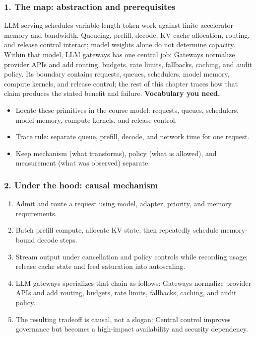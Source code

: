 \subsubsection*{1. The map: abstraction and prerequisites}
LLM serving schedules variable-length token work against finite accelerator memory and bandwidth. Queueing, prefill, decode, KV-cache allocation, routing, and release control interact; model weights alone do not determine capacity.
Within that model, LLM gateways has one central job: Gateways normalize provider APIs and add routing, budgets, rate limits, fallbacks, caching, and audit policy. Its boundary contains requests, queues, schedulers, model memory, compute kernels, and release control; the rest of this chapter traces how that claim produces the stated benefit and failure.
\textbf{Vocabulary you need.}\begin{itemize}
\item Locate these primitives in the course model: requests, queues, schedulers, model memory, compute kernels, and release control.
\item Trace rule: separate queue, prefill, decode, and network time for one request.
\item Keep mechanism (what transforms), policy (what is allowed), and measurement (what was observed) separate.
\end{itemize}
\subsubsection*{2. Under the hood: causal mechanism}\begin{enumerate}
\item Admit and route a request using model, adapter, priority, and memory requirements.
\item Batch prefill compute, allocate KV state, then repeatedly schedule memory-bound decode steps.
\item Stream output under cancellation and policy controls while recording usage; release cache state and feed saturation into autoscaling.
\item LLM gateways specializes that chain as follows: Gateways normalize provider APIs and add routing, budgets, rate limits, fallbacks, caching, and audit policy.
\item The resulting tradeoff is causal, not a slogan: Central control improves governance but becomes a high-impact availability and security dependency.
\end{enumerate}
